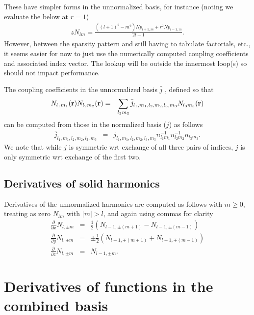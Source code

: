 \documentclass[12pt]{article}
\newcommand{\rv}{\vb{r}}
\begin{document}
These have simpler forms in the unnormalized basis, for instance (noting we evaluate the below at $r=1$)
\begin{eqnarray}
z N_{lm} = \frac{\left(\left(l +1\right)^{2}-m^{2}\right) \mathit{Np}_{l +1,m}+r^{2} \mathit{Np}_{l -1,m}}{2 l +1} .
\end{eqnarray}
However, between the sparsity pattern and still having to tabulate factorials, etc.,  it seems easier for now to just use the numerically computed coupling coefficients and associated index vector.  The lookup will be outside the innermost loop(s) so should not impact performance.

The coupling coefficients in the unnormalized basis $\bar{j}$ , defined so that
\begin{eqnarray}
  N_{l_1 m_1}(\rv) N_{l_2 m_2}(\rv) & = & \sum_{l_3 m_3} \bar{j}_{l_1, m_1, l_2, m_2, l_3, m_3} N_{l_3 m_3}(\rv)  
\end{eqnarray}
can be computed from those in the normalized basis ($j$) as follows
\begin{eqnarray}
  \bar{j}_{l_1, m_1, l_2, m_2, l_3, m_3} & = & j_{l_1, m_1, l_2, m_2, l_3, m_3} n^{-1}_{l_1 m_1} n^{-1}_{l_2 m_2} n_{l_3 m_3} .
\end{eqnarray}
We note that while $j$ is symmetric wrt exchange of all three pairs of indices, $\bar{j}$ is only symmetric wrt exchange of the first two.


\subsection{Derivatives of solid harmonics}
\label{sec:solder}

Derivatives of the unnormalized harmonics are computed as follows with $m\ge 0$, treating as zero $N_{lm}$ with $|m|>l$, and again using commas for clarity
\begin{eqnarray}
  \frac{\partial}{\partial x} N_{l,\pm m} & = & \frac{1}{2}\left( N_{l-1,\pm (m+1)} - N_{l-1,\pm (m-1)} \right) \nonumber \\
  \frac{\partial}{\partial y} N_{l,\pm m} & = & \pm \frac{1}{2}\left( N_{l-1,\mp (m+1)} + N_{l-1,\mp (m-1)} \right) \nonumber \\
  \frac{\partial}{\partial z} N_{l,\pm m} & = & N_{l-1,\pm m} . \nonumber
\end{eqnarray}

\section{Derivatives of functions in the combined basis}
\end{document}

